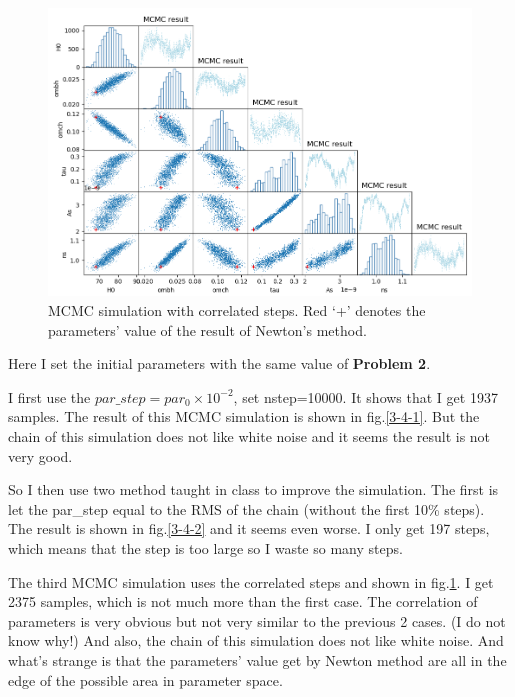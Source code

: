 \documentclass[showpacs, oneside, onecolumn, prl, amsmath, amssymb, nofootinbib, superscriptaddress, notitlepage]{revtex4-1}
\newcommand\bfig{\begin{figure}}
\newcommand\efig{\end{figure}}
\begin{document}
\bfig
	\centering
	\includegraphics[scale=0.7]{3-4-3corr.png}
	\caption{MCMC simulation with correlated steps. Red `+' denotes the parameters' value of the result of Newton's method.}
	\label{3-4-3}
\efig

Here I set the initial parameters with the same value of \textbf{Problem 2}.

I first use the $par\_step=par_0\times 10^{-2}$, set nstep=10000. It shows that I get 1937 samples. The result of this MCMC simulation is shown in fig.\ref{3-4-1}. But the chain of this simulation does not like white noise and it seems the result is not very good.

So I then use two method taught in class to improve the simulation. The first is let the par\_step equal to the RMS of the chain (without the first 10\% steps). The result is shown in fig.\ref{3-4-2} and it seems even worse. I only get 197 steps, which means that the step is too large so I waste so many steps.

The third MCMC simulation uses the correlated steps and shown in fig.\ref{3-4-3}. I get 2375 samples, which is not much more than the first case. The correlation of parameters is very obvious but not very similar to the previous 2 cases. (I do not know why!) And also, the chain of this simulation does not like white noise. And what's strange is that the parameters' value get by Newton method are all in the edge of the possible area in parameter space.
\end{document}
